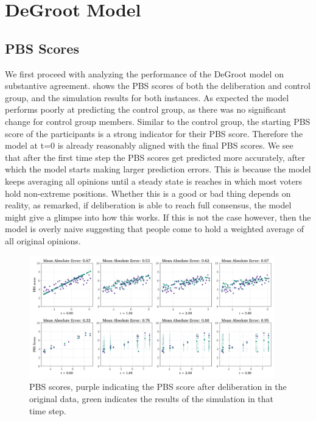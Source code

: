 \section{DeGroot Model} \label{degroot_results} \subsection{PBS Scores} We
first proceed with analyzing the performance of the DeGroot model on
substantive agreement.  shows the PBS scores of both the
deliberation and control group, and the simulation results for both instances.
As expected the model performs poorly at predicting the control group, as
there was no significant change for control group members. Similar to the
control group, the starting PBS score of the participants is a strong
indicator for their PBS score. Therefore the model at t=0 is already
reasonably aligned with the final PBS scores. We see that after the first time
step the PBS scores get predicted more accurately, after which the model
starts making larger prediction errors. This is because the model keeps
averaging all opinions until a steady state is reaches in which most voters
hold non-extreme positions. Whether this is a good or bad thing depends on
reality, as \citet{elsterMarketForumThree2002} remarked, if deliberation is
able to reach full consensus, the model might give a glimpse into how this
works. If this is not the case however, then the model is overly naive
suggesting that people come to hold a weighted average of all original
opinions.


\begin{figure}
	\begin{center}
		\includegraphics[width=0.95\textwidth]{Figures/pbs_scores.png}
	\end{center}
	\caption{PBS scores, purple indicating the PBS score after deliberation in the original data, green indicates the results of the simulation in that time step.}\label{fig:pbs}
\end{figure}

